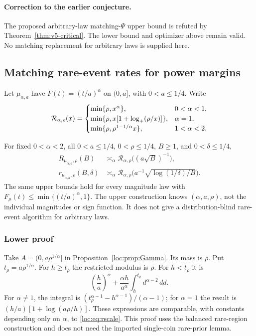 \paragraph{Correction to the earlier conjecture.}
The proposed arbitrary-law matching-$\Psi$ upper bound is refuted by
Theorem~\ref{thm:v5-critical}. The lower bound and optimizer above remain
valid. No matching replacement for arbitrary laws is supplied here.

\subsection{Matching rare-event rates for power margins}\label{loc:sec:power}
Let $\mu_{\alpha,a}$ have $F(t)=(t/a)^\alpha$ on $(0,a]$, with $0<a\le1/4$. Write
\begin{equation}\label{loc:eq:rscale}
 \mathcal R_{\alpha,\rho}(x)=
 \begin{cases}
 \min\{\rho,x^\alpha\},&0<\alpha<1,\\
 \min\{\rho,x[1+\log_+(\rho/x)]\},&\alpha=1,\\
 \min\{\rho,\rho^{1-1/\alpha}x\},&1<\alpha<2.
 \end{cases}
\end{equation}
\begin{theorem}\label{loc:thm:power}
For fixed $0<\alpha<2$, all $0<a\le1/4$, $0<\rho\le1/4$, $B\ge1$, and $0<\delta\le1/4$,
\begin{align*}
 R_{\mu_{\alpha,a},\rho}(B)&\asymp_\alpha
 \mathcal R_{\alpha,\rho}\bigl((a\sqrt B)^{-1}\bigr),\\
 r_{\mu_{\alpha,a},\rho}(B,\delta)&\asymp_\alpha
 \mathcal R_{\alpha,\rho}\bigl(a^{-1}\sqrt{\log(1/\delta)/B}\bigr).
\end{align*}
The same upper bounds hold for every magnitude law with $F_\mu(t)\le\min\{(t/a)^\alpha,1\}$. The upper construction knows $(\alpha,a,\rho)$, not the individual magnitudes or sign function. It does not give a distribution-blind rare-event algorithm for arbitrary laws.
\end{theorem}

\subsubsection{Lower proof}
Take $A=(0,a\rho^{1/\alpha}]$ in Proposition~\ref{loc:prop:Gamma}. Its mass is $\rho$. Put $t_\rho=a\rho^{1/\alpha}$. For $h\ge t_\rho$ the restricted modulus is $\rho$. For $h<t_\rho$ it is
\begin{equation}\label{loc:eq:restrictedpower}
 \left(\frac h a\right)^\alpha+
 \frac{\alpha h}{a^\alpha}\int_h^{t_\rho}d^{\alpha-2}\,dd.
\end{equation}
For $\alpha\ne1$, the integral is
$(t_\rho^{\alpha-1}-h^{\alpha-1})/(\alpha-1)$; for $\alpha=1$ the result is
$(h/a)[1+\log(a\rho/h)]$. These expressions are comparable, with constants depending only on $\alpha$, to \eqref{loc:eq:rscale}. This proof uses the balanced rare-region construction and does not need the imported single-coin rare-prior lemma.

